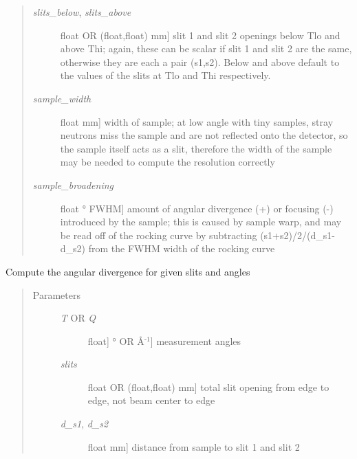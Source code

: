 \documentclass[letterpaper,10pt,english]{sphinxmanual}
\begin{document}
\begin{fulllineitems}
\begin{quote}
\begin{description}
\begin{description}
\item[{\emph{slits\_below}, \emph{slits\_above}}] \leavevmode{[}float OR (float,float) \textbar{} mm{]}
slit 1 and slit 2 openings below Tlo and above Thi; again, these
can be scalar if slit 1 and slit 2 are the same, otherwise they
are each a pair (s1,s2).  Below and above default to the values of
the slits at Tlo and Thi respectively.

\item[{\emph{sample\_width}}] \leavevmode{[}float \textbar{} mm{]}
width of sample; at low angle with tiny samples, stray neutrons
miss the sample and are not reflected onto the detector, so the
sample itself acts as a slit, therefore the width of the sample
may be needed to compute the resolution correctly

\item[{\emph{sample\_broadening}}] \leavevmode{[}float \textbar{} ° FWHM{]}
amount of angular divergence (+) or focusing (-) introduced by
the sample; this is caused by sample warp, and may be read off
of the rocking curve by subtracting (s1+s2)/2/(d\_s1-d\_s2) from
the FWHM width of the rocking curve

\end{description}

\end{description}\end{quote}

\begin{fulllineitems}
\label{api/instrument:refl1d.instrument.Monochromatic.calc_dT}
Compute the angular divergence for given slits and angles
\begin{quote}\begin{description}
\item[{Parameters }] \leavevmode\begin{description}
\item[{\emph{T} OR \emph{Q}}] \leavevmode{[}{[}float{]} \textbar{} ° OR Å$^{\text{-1}}${]}
measurement angles

\item[{\emph{slits}}] \leavevmode{[}float OR (float,float) \textbar{} mm{]}
total slit opening from edge to edge, not beam center to edge

\item[{\emph{d\_s1}, \emph{d\_s2}}] \leavevmode{[}float \textbar{} mm{]}
distance from sample to slit 1 and slit 2


\end{description}
\end{description}
\end{quote}
\end{fulllineitems}
\end{fulllineitems}
\end{document}
